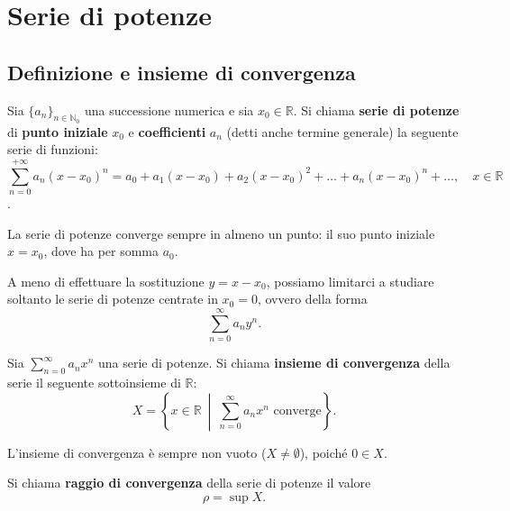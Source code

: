 
\section{Serie di potenze}

\subsection{Definizione e insieme di convergenza}

\begin{definition}
Sia $\{a_n\}_{n \in \mathbb{N}_0}$ una successione numerica e sia $x_0 \in \mathbb{R}$. Si chiama \textbf{serie di potenze} di \textbf{punto iniziale} $x_0$ e \textbf{coefficienti} $a_n$ (detti anche termine generale) la seguente serie di funzioni:
\[
\sum_{n=0}^{+\infty} a_n (x - x_0)^n = a_0 + a_1 (x - x_0) + a_2 (x - x_0)^2 + \dots + a_n (x - x_0)^n + \dots, \quad x \in \mathbb{R}
\]
.
\end{definition}

\begin{oss}
La serie di potenze converge sempre in almeno un punto: il suo punto iniziale $x = x_0$, dove ha per somma $a_0$.
\end{oss}

\begin{oss}
A meno di effettuare la sostituzione $y = x - x_0$, possiamo limitarci a studiare soltanto le serie di potenze centrate in $x_0 = 0$, ovvero della forma
\[
\sum_{n=0}^{\infty} a_n y^n.
\]
\end{oss}

\begin{definition}
Sia $\sum_{n=0}^{\infty} a_n x^n$ una serie di potenze. Si chiama \textbf{insieme di convergenza} della serie il seguente sottoinsieme di $\mathbb{R}$:
\[
X = \left\{ x \in \mathbb{R} \ \middle|\ \sum_{n=0}^{\infty} a_n x^n \text{ converge} \right\}.
\]
\end{definition}

\begin{oss}
L'insieme di convergenza è sempre non vuoto ($X \neq \emptyset$), poiché $0 \in X$.
\end{oss}

\begin{definition}
Si chiama \textbf{raggio di convergenza} della serie di potenze il valore
\[
\rho = \sup X.
\]
\end{definition}

